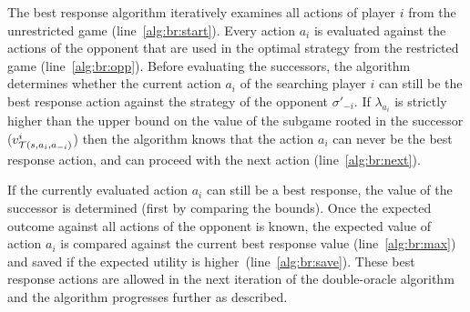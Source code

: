 The best response algorithm iteratively examines all actions of player $i$ from the unrestricted game (line~\ref{alg:br:start}).
Every action $a_i$ is evaluated against the actions of the opponent that are used in the optimal strategy from the restricted game (line~\ref{alg:br:opp}).
Before evaluating the successors, the algorithm determines whether the current action $a_i$ of the searching player $i$ can still be the best response action
against the strategy of the opponent $\sigma'_{-i}$.
If $\lambda_{a_i}$ is strictly higher than the upper bound on the value of the subgame rooted in the successor (\ie $v^i_{\mathcal{T}(s,a_i,a_{-i})}$) then the algorithm knows that the action $a_i$ can never be the best response action, and can proceed with the next action (line~\ref{alg:br:next}).
%

If the currently evaluated action $a_i$ can still be a best response, the value of the successor is determined (first by comparing the bounds). Once the expected outcome against all actions of the opponent is known, the expected value of action $a_i$ is compared against the current best response value (line~\ref{alg:br:max}) and saved if the expected utility is higher~(line~\ref{alg:br:save}). These best response actions are allowed in the next iteration of the double-oracle algorithm and the algorithm progresses further as described.

